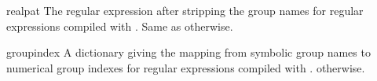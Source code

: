 \begin{datadesc}{realpat}
The regular expression after stripping the group names for regular
expressions compiled with .  Same as 
otherwise.
\end{datadesc}

\begin{datadesc}{groupindex}
A dictionary giving the mapping from symbolic group names to numerical
group indexes for regular expressions compiled with .
 otherwise.
\end{datadesc}
